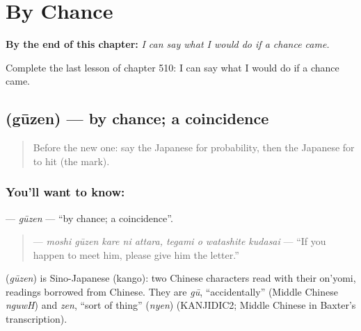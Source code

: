 
\chapter{By Chance}
\label{ch:ja-by-chance}

\begin{chapteropening}
\textbf{By the end of this chapter:} \emph{I can say what I would do if a chance came.}

Complete the last lesson of chapter 510: I can say what I would do if a chance came.
\end{chapteropening}

\section[\texorpdfstring{\ja{ぐうぜん} (gūzen)}{ぐうぜん (gūzen)}]{ (gūzen) — by chance; a coincidence}

\label{lesson:JA-C510-guuzen}



\begin{quote}
Before the new one: say the Japanese for probability, then the Japanese for to hit (the mark).
\end{quote}

\subsection*{You'll want to know: }
\textbf{} — \emph{gūzen} — \textquotedblleft{}by chance; a coincidence\textquotedblright{}.

\begin{quote}
\textbf{     } — \emph{moshi gūzen kare ni attara, tegami o watashite kudasai} — \textquotedblleft{}If you happen to meet him, please give him the letter.\textquotedblright{}
\end{quote}

\begin{cousinweb}
\textbf{} (\emph{gūzen}) is Sino-Japanese (kango): two Chinese characters read with their on'yomi, readings borrowed from Chinese. They are \emph{gū}, \textquotedblleft{}accidentally\textquotedblright{} (Middle Chinese \emph{nguwH}) and \emph{zen}, \textquotedblleft{}sort of thing\textquotedblright{} (\emph{nyen}) (KANJIDIC2; Middle Chinese in Baxter's transcription).
\end{cousinweb}

